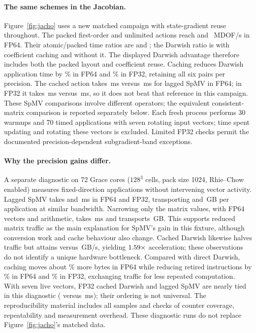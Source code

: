 \documentclass[sigconf,nonacm]{acmart}
\begin{document}
\paragraph{The same schemes in the Jacobian.} Figure~\ref{fig:jacho} uses a
new matched campaign with state-gradient reuse throughout. The packed
first-order and unlimited actions reach \jachoFirstPacked{} and
\jachoUnlimPacked{}~MDOF/s in FP64. Their atomic/packed time ratios are
\jachoFirstLayoutRatio{} and \jachoUnlimLayoutRatio; the Darwish ratio is
\jachoDmLayoutRatio{} with coefficient caching and
\jachoDmDoubleDirectLayoutRatio{} without it. The displayed Darwish advantage
therefore includes both the packed layout and coefficient reuse.
Caching reduces Darwish application time by \jachoDmDoubleCacheSaved\% in FP64
and \jachoDmSingleCacheSaved\% in FP32, retaining all six pairs per precision.
The cached action takes \jachoDmDoubleCacheMs{}\,ms versus
\jachoDmDoubleSpmvMs{}\,ms for lagged SpMV in FP64; in FP32 it takes
\jachoDmSingleCacheMs{}\,ms versus \jachoDmSingleSpmvMs{}\,ms, so it does
not beat that reference in this campaign. These SpMV comparisons involve different operators;
the equivalent consistent-matrix comparison is reported separately below.
Each fresh process performs 30 warmups and 70 timed applications with seven
rotating input vectors; time spent updating and rotating these vectors is excluded. Limited FP32 checks permit
the documented precision-dependent subgradient-band exceptions.

\paragraph{Why the precision gains differ.}
A separate diagnostic on 72 Grace cores ($128^3$ cells, pack size 1024,
Rhie--Chow enabled) measures fixed-direction applications without intervening
vector activity. Lagged SpMV takes \pdSpmvDoubleMs{} and
\pdSpmvSingleMs{}\,ms in FP64 and FP32, transporting
\pdSpmvDoubleGB{} and \pdSpmvSingleGB{}\,GB per application at similar
bandwidth. Narrowing only the matrix values, with FP64 vectors and arithmetic,
takes \pdSpmvMixedMs{}\,ms and transports \pdSpmvMixedGB{}\,GB.
This supports reduced matrix traffic as the main explanation for SpMV's gain
in this fixture, although conversion work and cache behaviour also change.
Cached Darwish likewise halves traffic but attains
\pdCachedDoubleBandwidth{} versus \pdCachedSingleBandwidth{}\,GB/s, yielding
$1.59\times$ acceleration; these observations do not identify a
unique hardware bottleneck. Compared with direct Darwish, caching moves about
\pdDoubleTrafficExtra\% more bytes in FP64 while reducing retired instructions by
\pdDoubleInstructionsSaved\% in FP64 and \pdSingleInstructionsSaved\% in FP32,
exchanging traffic for less repeated computation. With seven live vectors,
FP32 cached Darwish and lagged SpMV are nearly tied in this diagnostic
(\pdCachedLiveMs{} versus \pdSpmvLiveMs{}\,ms); their ordering is not universal.
The reproducibility material includes all samples and checks of counter
coverage, repeatability and measurement overhead. These diagnostic runs do not replace Figure~\ref{fig:jacho}'s matched data.
\end{document}
